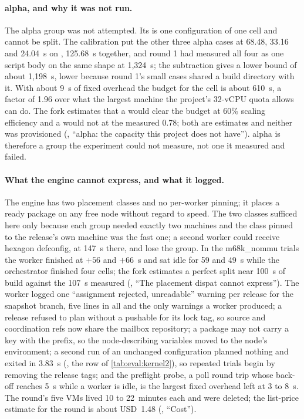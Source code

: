 \paragraph{alpha, and why it was not run.}
The alpha group was not attempted. Its  is one
configuration of one cell and cannot be split. The calibration put the other
three alpha cases at 68.48, 33.16 and 24.04~s on , 125.68~s
together, and round 1 had measured all four as one script body on the same
shape at 1,324~s; the subtraction gives  a lower bound of
about 1,198~s, lower because round 1's small cases shared a build directory
with it. With about 9~s of fixed overhead the budget for the cell is about
610~s, a factor of 1.96 over what the largest machine the project's 32-vCPU
quota allows can do. The fork estimates that a  would
clear the budget at 60\% scaling efficiency and a  would
not at the measured 0.78; both are estimates and neither was provisioned
(, ``alpha: the capacity this project does
not have''). alpha is therefore a group the experiment could not measure, not
one it measured and failed.

\paragraph{What the engine cannot express, and what it logged.}
The engine has two placement classes and no per-worker pinning; it places a
ready package on any free node without regard to speed. The two classes
sufficed here only because each group needed exactly two machines and the
class pinned to the release's own machine was the fast one; a second
 worker could receive hexagon defconfig, at 147~s there,
and lose the group. In the m68k\_nommu trials the worker finished at $+56$ and
$+66$~s and sat idle for 59 and 49~s while the orchestrator finished four
cells; the fork estimates a perfect split near 100~s of build against the
107~s measured (, ``The placement dispat
cannot express''). The worker logged one  ``assignment rejected,
unreadable'' warning per release for the snapshot branch, five lines in all
and the only warnings a worker produced; a release refused to plan without a
pushable  for its lock tag, so source and coordination refs now
share the mailbox repository; a package  may not carry a key with the
 prefix, so the node-describing variables moved to the node's
environment; a second run of an unchanged configuration planned nothing and
exited in 3.83~s (, the row of
\cref{tab:eval:kernel2}), so repeated trials begin by removing the release
tags; and the preflight probe,
a poll round trip whose back-off reaches 5~s while a worker is idle, is the
largest fixed overhead left at 3 to 8~s. The round's five VMs lived 10 to
22~minutes each and were deleted; the list-price estimate for the round is
about USD~1.48 (, ``Cost'').

